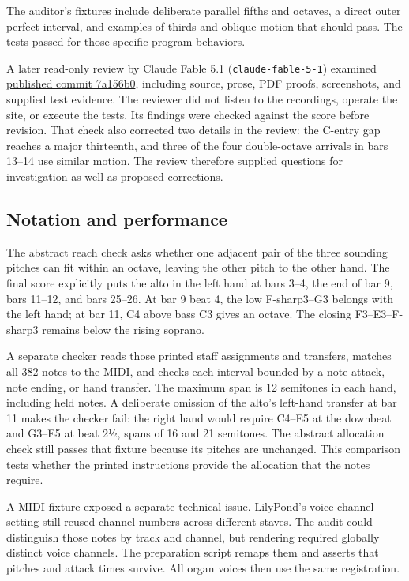 \documentclass[11pt,a4paper]{article}
\begin{document}
The auditor's fixtures include deliberate parallel fifths and octaves, a direct outer perfect interval, and examples of thirds and oblique motion that should pass. The tests passed for those specific program behaviors.

A later read-only review by Claude Fable 5.1 (\texttt{claude-fable-5-1}) examined \href{https://github.com/chi-feng/fuga-inversa/commit/7a156b0}{published commit 7a156b0}, including source, prose, PDF proofs, screenshots, and supplied test evidence. The reviewer did not listen to the recordings, operate the site, or execute the tests. Its findings were checked against the score before revision. That check also corrected two details in the review: the C-entry gap reaches a major thirteenth, and three of the four double-octave arrivals in bars 13--14 use similar motion. The review therefore supplied questions for investigation as well as proposed corrections.

\subsection{Notation and performance}\label{notation-and-performance}

The abstract reach check asks whether one adjacent pair of the three sounding pitches can fit within an octave, leaving the other pitch to the other hand. The final score explicitly puts the alto in the left hand at bars 3--4, the end of bar 9, bars 11--12, and bars 25--26. At bar 9 beat 4, the low F-sharp3--G3 belongs with the left hand; at bar 11, C4 above bass C3 gives an octave. The closing F3--E3--F-sharp3 remains below the rising soprano.

A separate checker reads those printed staff assignments and transfers, matches all 382 notes to the MIDI, and checks each interval bounded by a note attack, note ending, or hand transfer. The maximum span is 12 semitones in each hand, including held notes. A deliberate omission of the alto's left-hand transfer at bar 11 makes the checker fail: the right hand would require C4--E5 at the downbeat and G3--E5 at beat 2½, spans of 16 and 21 semitones. The abstract allocation check still passes that fixture because its pitches are unchanged. This comparison tests whether the printed instructions provide the allocation that the notes require.

A MIDI fixture exposed a separate technical issue. LilyPond's voice channel setting still reused channel numbers across different staves. The audit could distinguish those notes by track and channel, but rendering required globally distinct voice channels. The preparation script remaps them and asserts that pitches and attack times survive. All organ voices then use the same registration.
\end{document}

